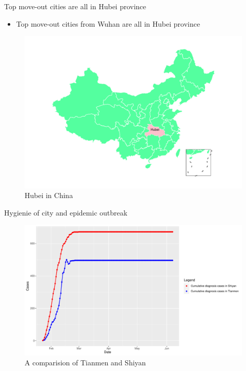 \documentclass[10pt,ignorenonframetext,aspectratio=169,notes=hide,]{beamer}
\providecommand{\tightlist}{%
  \setlength{\itemsep}{0pt}\setlength{\parskip}{0pt}}
\begin{document}
\begin{frame}{Top move-out cities are all in Hubei province}
\protect\hypertarget{top-move-out-cities-are-all-in-hubei-province}{}

\begin{itemize}
\tightlist
\item
  Top move-out cities from Wuhan are all in Hubei province
\end{itemize}

\begin{figure}
\centering
\includegraphics{slides_files/figure-beamer/fig2-1.pdf}
\caption{\label{fig:fig2}Hubei in China}
\end{figure}

\end{frame}

\begin{frame}{Hygienie of city and epidemic outbreak}
\protect\hypertarget{hygienie-of-city-and-epidemic-outbreak}{}

\begin{figure}
\includegraphics[width=1\linewidth]{slides_files/figure-beamer/fig3-1} \caption{A comparision of Tianmen and Shiyan}\label{fig:fig3}
\end{figure}

\end{frame}
\end{document}
